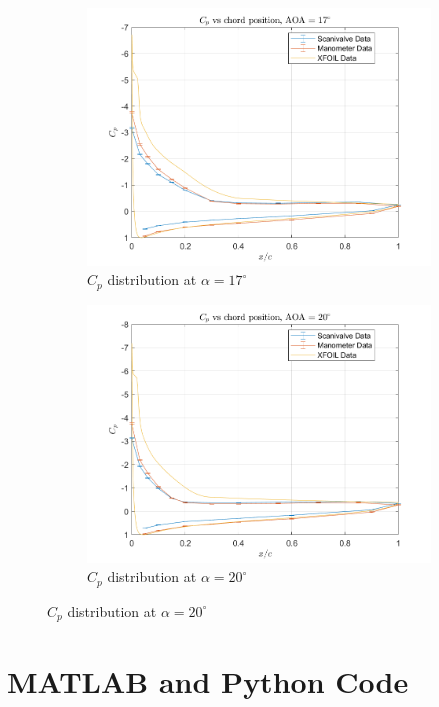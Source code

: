 \documentclass[runningheads]{llncs}
\begin{document}
\begin{figure}[H]
\begin{subfigure}[b]{0.37\textwidth}
        \includegraphics[width=\textwidth]{figures/AOA17.png}
        \caption{$C_p$ distribution at $\alpha = 17^\circ$}
        \label{fig:cp_17}
    \end{subfigure}
    \begin{subfigure}[b]{0.37\textwidth}
        \centering
        \includegraphics[width=\textwidth]{figures/AOA20.png}
        \caption{$C_p$ distribution at $\alpha = 20^\circ$}
        \label{fig:cp_20}
    \end{subfigure}
    \label{fig:all_CP}
\end{figure}

\section{MATLAB and Python Code}
\end{document}
